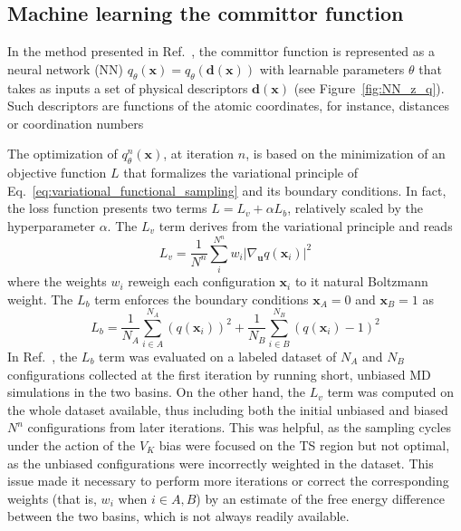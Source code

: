     \subsection{Machine learning the committor function}
    \label{sec:learning_committor}
        In the method presented in Ref.~, the committor function is represented as a neural network (NN) $q_\theta(\textbf{x}) = q_\theta(\textbf{d}(\textbf{x}))$ with learnable parameters $\theta$ that takes as inputs a set of physical descriptors $\textbf{d}(\textbf{x})$ (see Figure~\ref{fig:NN_z_q}).
        Such descriptors are functions of the atomic coordinates, for instance, distances or coordination numbers
        
        The optimization of $q_\theta^n (\textbf{x})$, at iteration $n$, is based on the minimization of an objective function $L$ that formalizes the variational principle of Eq.~\ref{eq:variational_functional_sampling} and its boundary conditions.
        In fact, the loss function presents two terms $L = L_v + \alpha L_b$, relatively scaled by the hyperparameter $\alpha$.
        The $L_v$ term derives from the variational principle and reads
            \begin{equation}
                L_v = \frac{1}{N^n} \sum_i^{N^n}  w_i |\nabla_\textbf{u} q(\textbf{x}_i)|^2
                \label{eq:loss_variational}
            \end{equation}
        where the weights $w_i$ reweigh each configuration $\textbf{x}_i$ to it natural Boltzmann weight. 
        The $L_b$ term enforces the boundary conditions $\textbf{x}_A=0$ and $\textbf{x}_B=1$ as
            \begin{equation}
                L_b = \frac{1}{N_A}\sum_{i \in A}^{N_A} (q(\textbf{x}_i))^2 + \frac{1}{N_B}\sum_{i \in B}^{N_B} (q(\textbf{x}_i) - 1)^2
                \label{eq:loss_boundary}
            \end{equation}
        In Ref.~, the $L_b$ term was evaluated on a labeled dataset of $N_A$ and $N_B$ configurations collected at the first iteration by running short, unbiased MD simulations in the two basins.
        On the other hand, the $L_v$ term was computed on the whole dataset available, thus including both the initial unbiased and biased $N^n$ configurations from later iterations. 
        This was helpful, as the sampling cycles under the action of the $V_K$ bias were focused on the TS region but not optimal, as the unbiased configurations were incorrectly weighted in the dataset.
        This issue made it necessary to perform more iterations or correct the corresponding weights (that is, $w_i$ when $i\in A,B$) by an estimate of the free energy difference between the two basins, which is not always readily available.

